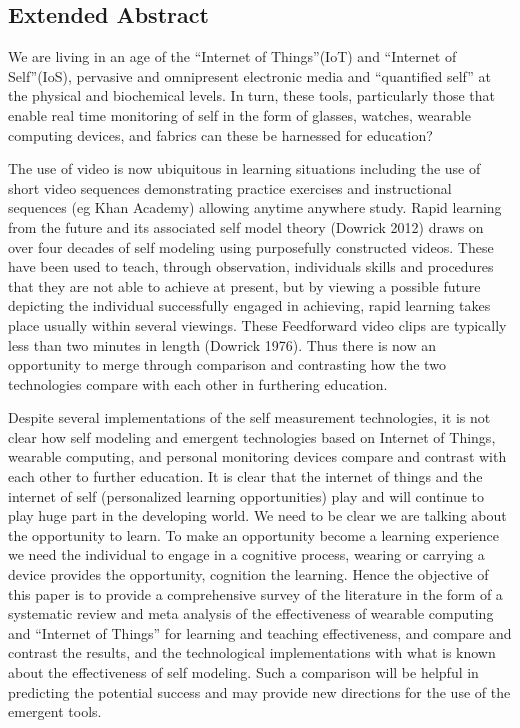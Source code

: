 \subsection{Extended Abstract}


We are living in an age of the “Internet of Things”(IoT) and “Internet of Self”(IoS), pervasive and omnipresent electronic media and “quantified self” at the physical and biochemical levels. In turn, these tools, particularly those that enable real time monitoring of self in the form of glasses, watches, wearable computing devices, and fabrics can these be harnessed for education?

The use of video is now ubiquitous in learning situations including the use of short video sequences demonstrating practice exercises and instructional sequences (eg Khan Academy) allowing anytime anywhere study. Rapid learning from the future and its associated self model theory (Dowrick 2012) draws on over four decades of self modeling using purposefully constructed videos. These have been used to teach, through observation, individuals skills and procedures that they are not able to achieve at present, but by viewing a possible future depicting the individual successfully engaged in achieving, rapid learning takes place usually within several viewings. These Feedforward video clips are typically less than two minutes in length (Dowrick 1976). Thus there is now an opportunity to merge through comparison and contrasting how the two technologies compare with each other in furthering education.

Despite several implementations of the self measurement technologies, it is not clear how self modeling and emergent technologies based on Internet of Things, wearable computing, and personal monitoring devices compare and contrast with each other to further education. It is clear that the internet of things and the internet of self (personalized learning opportunities) play and will continue to play huge part in the developing world. We need to be clear we are talking about the opportunity to learn. To make an opportunity become a learning experience we need the individual to engage in a cognitive process, wearing or carrying a device provides the opportunity, cognition the learning. Hence the objective of this paper is to provide a comprehensive survey of the literature in the form of a systematic review and meta analysis of the effectiveness of wearable computing and “Internet of Things” for learning and teaching effectiveness, and compare and contrast the results, and the technological implementations with what is known about the effectiveness of self modeling. Such a comparison will be helpful in predicting the potential success and may provide new directions for the use of the emergent tools.

